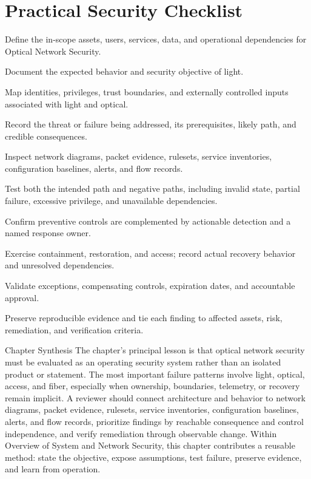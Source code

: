 \documentclass[11pt,letterpaper]{article}
\begin{document}
\section*{Practical Security Checklist}
\begin{CornellChecklist}
\item Define the in-scope assets, users, services, data, and operational dependencies for Optical Network Security.
\item Document the expected behavior and security objective of light.
\item Map identities, privileges, trust boundaries, and externally controlled inputs associated with light and optical.
\item Record the threat or failure being addressed, its prerequisites, likely path, and credible consequences.
\item Inspect network diagrams, packet evidence, rulesets, service inventories, configuration baselines, alerts, and flow records.
\item Test both the intended path and negative paths, including invalid state, partial failure, excessive privilege, and unavailable dependencies.
\item Confirm preventive controls are complemented by actionable detection and a named response owner.
\item Exercise containment, restoration, and access; record actual recovery behavior and unresolved dependencies.
\item Validate exceptions, compensating controls, expiration dates, and accountable approval.
\item Preserve reproducible evidence and tie each finding to affected assets, risk, remediation, and verification criteria.
\end{CornellChecklist}
\begin{CornellSummaryBox}{Chapter Synthesis}
The chapter's principal lesson is that optical network security must be evaluated as an operating security system rather than an isolated product or statement. The most important failure patterns involve light, optical, access, and fiber, especially when ownership, boundaries, telemetry, or recovery remain implicit. A reviewer should connect architecture and behavior to network diagrams, packet evidence, rulesets, service inventories, configuration baselines, alerts, and flow records, prioritize findings by reachable consequence and control independence, and verify remediation through observable change. Within Overview of System and Network Security, this chapter contributes a reusable method: state the objective, expose assumptions, test failure, preserve evidence, and learn from operation.
\end{CornellSummaryBox}
\end{document}
